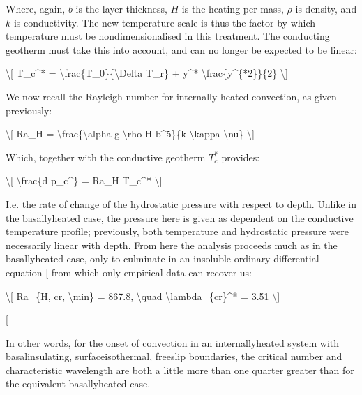 \documentclass[letterpaper,10pt,english]{jupyterBook}
\begin{document}
\sphinxAtStartPar
Where, again, \(b\) is the layer thickness, \(H\) is the heating per mass, \(\rho\) is density, and \(k\) is conductivity. The new temperature scale is thus the factor by which temperature must be non\sphinxhyphen{}dimensionalised in this treatment. The conducting geotherm must take this into account, and can no longer be expected to be linear:

\sphinxAtStartPar
\textbackslash{}{[} T\_c\textasciicircum{}* = \textbackslash{}frac\{T\_0\}\{\textbackslash{}Delta T\_r\} + y\textasciicircum{}* \sphinxhyphen{} \textbackslash{}frac\{y\textasciicircum{}\{*2\}\}\{2\} \textbackslash{}{]}

\sphinxAtStartPar
We now recall the Rayleigh number for internally heated convection, as given previously:

\sphinxAtStartPar
\textbackslash{}{[} Ra\_H = \textbackslash{}frac\{\textbackslash{}alpha g \textbackslash{}rho H b\textasciicircum{}5\}\{k \textbackslash{}kappa \textbackslash{}nu\} \textbackslash{}{]}

\sphinxAtStartPar
Which, together with the conductive geotherm \(T_c^*\) provides:

\sphinxAtStartPar
\textbackslash{}{[} \textbackslash{}frac\{d p\_c\textasciicircum{}\} = \sphinxhyphen{}Ra\_H T\_c\textasciicircum{}* \textbackslash{}{]}

\sphinxAtStartPar
I.e. the rate of change of the hydrostatic pressure with respect to depth. Unlike in the basally\sphinxhyphen{}heated case, the pressure here is given as dependent on the conductive temperature profile; previously, both temperature and hydrostatic pressure were necessarily linear with depth. From here the analysis proceeds much as in the basally\sphinxhyphen{}heated case, only to culminate in an insoluble ordinary differential equation {[}\sphinxcite{references:id89}{]} from which only empirical data can recover us:

\sphinxAtStartPar
\textbackslash{}{[} Ra\_\{H, cr, \textbackslash{}min\} = 867.8, \textbackslash{}quad \textbackslash{}lambda\_\{cr\}\textasciicircum{}* = 3.51 \textbackslash{}{]}

\sphinxAtStartPar
{[}\sphinxcite{references:id77}{]}

\sphinxAtStartPar
In other words, for the onset of convection in an internally\sphinxhyphen{}heated system with basal\sphinxhyphen{}insulating, surface\sphinxhyphen{}isothermal, free\sphinxhyphen{}slip boundaries, the critical  number and characteristic wavelength are both a little more than one quarter greater than for the equivalent basally\sphinxhyphen{}heated case.
\end{document}

